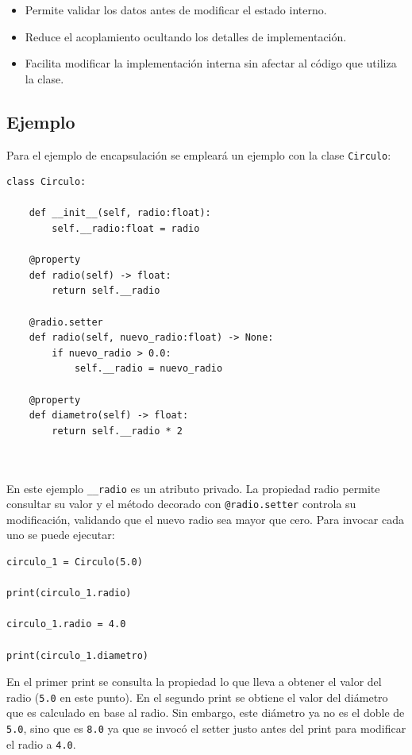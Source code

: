 \documentclass[11pt,a5paper,twoside]{book}
\begin{document}
\begin{itemize}
\item  Permite validar los datos antes de modificar el estado interno.
\item  Reduce el acoplamiento ocultando los detalles de implementación.
\item  Facilita modificar la implementación interna sin afectar al código que utiliza la clase.
\end{itemize}
\subsection{Ejemplo}
Para el ejemplo de encapsulación se empleará un ejemplo con la clase {\scriptsize \texttt{Circulo}}:

\newpage


\begin{tcolorbox}
\scriptsize
 \begin{verbatim}
class Circulo:

    def __init__(self, radio:float):
        self.__radio:float = radio

    @property
    def radio(self) -> float:
        return self.__radio

    @radio.setter
    def radio(self, nuevo_radio:float) -> None:
        if nuevo_radio > 0.0:
            self.__radio = nuevo_radio

    @property
    def diametro(self) -> float:
        return self.__radio * 2

    
\end{verbatim}
\end{tcolorbox}
En este ejemplo {\scriptsize \texttt{\_\_radio}} es un atributo privado. La propiedad radio permite consultar su valor y el método decorado con {\scriptsize \texttt{@radio.setter}} controla su modificación, validando que el nuevo radio sea mayor que cero.
Para invocar cada uno se puede ejecutar:


\begin{tcolorbox}
\scriptsize
 \begin{verbatim}
circulo_1 = Circulo(5.0)

print(circulo_1.radio)

circulo_1.radio = 4.0

print(circulo_1.diametro)
\end{verbatim}
\end{tcolorbox}
En el primer print se consulta la propiedad lo que lleva a obtener el valor del radio ({\scriptsize \texttt{5.0}} en este punto). En el segundo print se obtiene el valor del diámetro que es calculado en base al radio. Sin embargo, este diámetro ya no es el doble de {\scriptsize \texttt{5.0}}, sino que es {\scriptsize \texttt{8.0}} ya que se invocó el setter justo antes del print para modificar el radio a {\scriptsize \texttt{4.0}}.
\end{document}
